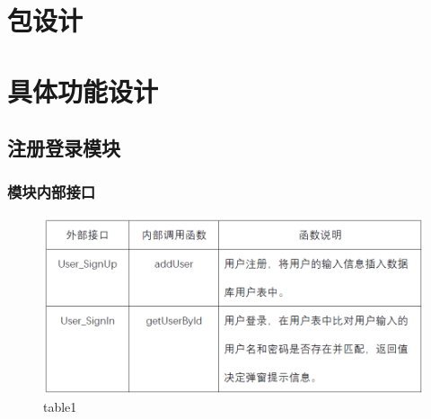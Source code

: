 \section{包设计}
\section{具体功能设计}
\subsection{注册登录模块}
\subsubsection{模块内部接口}
\begin{figure}[!htbp]
	\centering
	\includegraphics[scale=0.7]{image/b1.png} %
	\caption{table1} %
\end{figure}
